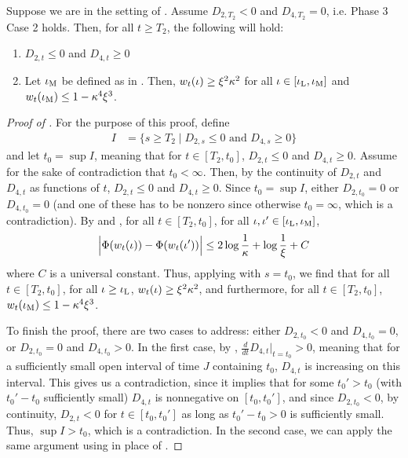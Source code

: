 \begin{lemma}  \label{lemma:case2_invariant}
Suppose we are in the setting of . Assume $D_{2, T_2} < 0$ and $D_{4, T_2} = 0$, i.e. Phase 3 Case 2 holds. Then, for all $t \geq T_2$, the following will hold:
\begin{enumerate}
    \item $D_{2, t} \leq 0$ and $D_{4, t} \geq 0$
    \item Let $\iota_{\textup{M}}$ be defined as in . Then, $w_t(\iota) \geq \xi^2 \kappa^2$ for all $\iota \in [\iota_{\textup{L}}, \iota_{\textup{M}}]$ and $w_t(\iota_{\textup{M}}) \leq 1 - \kappa^4 \xi^3$. 
\end{enumerate}
\end{lemma}
\begin{proof}[Proof of ]
For the purpose of this proof, define
\begin{align}
I
& = \{s \geq T_2 \mid D_{2, s} \leq 0 \text{ and } D_{4, s} \geq 0 \}
\end{align}
and let $t_0 = \sup I$, meaning that for $t \in [T_2, t_0]$, $D_{2, t} \leq 0$ and $D_{4, t} \geq 0$. Assume for the sake of contradiction that $t_0 < \infty$. Then, by the continuity of $D_{2, t}$ and $D_{4, t}$ as functions of $t$, $D_{2, t} \leq 0$ and $D_{4, t} \geq 0$. Since $t_0 = \sup I$, either $D_{2, t_0} = 0$ or $D_{4, t_0} = 0$ (and one of these has to be nonzero since otherwise $t_0 = \infty$, which is a contradiction). By  and , for all $t \in [T_2, t_0]$, for all $\iota, \iota' \in [\iota_{\textup{L}}, \iota_{\textup{M}}]$,
\begin{align}
\Big| \Phi(w_t(\iota)) - \Phi(w_t(\iota'))\Big| \leq 2 \log \frac{1}{\kappa} + \log \frac{1}{\xi} + C
\end{align}
where $C$ is a universal constant. Thus, applying  with $s = t_0$, we find that for all $t \in [T_2, t_0]$, for all $\iota \geq \iota_{\textup{L}}$, $w_t(\iota) \geq \xi^2 \kappa^2$, and furthermore, for all $t \in [T_2, t_0]$, $w_t(\iota_{\textup{M}}) \leq 1 - \kappa^4 \xi^3$.

To finish the proof, there are two cases to address: either $D_{2, t_0} < 0$ and $D_{4, t_0} = 0$, or $D_{2, t_0} = 0$ and $D_{4, t_0} > 0$. In the first case, by , $\frac{d}{dt} D_{4, t} \Big|_{t = t_0} > 0$, meaning that for a sufficiently small open interval of time $J$ containing $t_0$, $D_{4, t}$ is increasing on this interval. This gives us a contradiction, since it implies that for some $t_0' > t_0$ (with $t_0' - t_0$ sufficiently small) $D_{4, t}$ is nonnegative on $[t_0, t_0']$, and since $D_{2, t_0} < 0$, by continuity, $D_{2, t} < 0$ for $t \in [t_0, t_0']$ as long as $t_0' - t_0 > 0$ is sufficiently small. Thus, $\sup I > t_0$, which is a contradiction. In the second case, we can apply the same argument using  in place of .


\end{proof}
